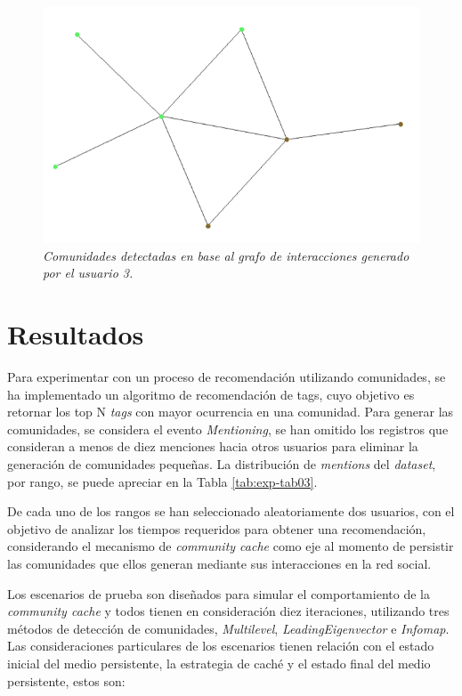 \begin{figure}
  \centering
  \includegraphics[scale=.7]{images/Figura5-7}
  \caption{\em Comunidades detectadas en base al grafo de interacciones generado por el usuario 3.}
  \label{fig:exp-im7}
\end{figure}

\section{Resultados}

Para experimentar con un proceso de recomendación utilizando comunidades, se ha implementado un algoritmo de recomendación de tags, cuyo objetivo es retornar los top N \textit{tags} con mayor ocurrencia en una comunidad. Para generar las comunidades, se considera el evento \textit{Mentioning}, se han omitido los registros que consideran a menos de diez menciones hacia otros usuarios para eliminar la generación de comunidades pequeñas. La distribución de \textit{mentions} del \textit{dataset}, por rango, se puede apreciar en la Tabla \ref{tab:exp-tab03}.

De cada uno de los rangos se han seleccionado aleatoriamente dos usuarios, con el objetivo de analizar los tiempos requeridos para obtener una recomendación, considerando el mecanismo de \textit{community cache} como eje al momento de persistir las comunidades que ellos generan mediante sus interacciones en la red social. 

Los escenarios de prueba son diseñados para simular el comportamiento de la \textit{community cache} y todos tienen en consideración diez iteraciones, utilizando tres métodos de detección de comunidades, \textit{Multilevel}, \textit{LeadingEigenvector} e \textit{Infomap}. Las consideraciones particulares de los escenarios tienen relación con el estado inicial del medio persistente, la estrategia de caché y el estado final del medio persistente, estos son:

